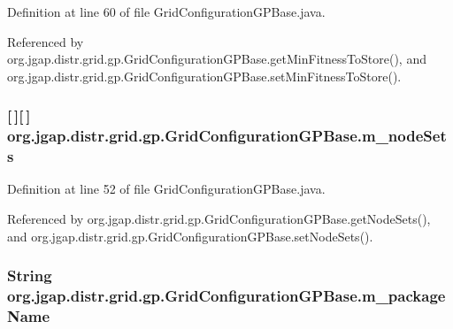 Definition at line 60 of file Grid\-Configuration\-G\-P\-Base.\-java.



Referenced by org.\-jgap.\-distr.\-grid.\-gp.\-Grid\-Configuration\-G\-P\-Base.\-get\-Min\-Fitness\-To\-Store(), and org.\-jgap.\-distr.\-grid.\-gp.\-Grid\-Configuration\-G\-P\-Base.\-set\-Min\-Fitness\-To\-Store().

\hypertarget{classorg_1_1jgap_1_1distr_1_1grid_1_1gp_1_1_grid_configuration_g_p_base_a838942c287a96ee78bdb39aa2fd7966a}{
\subsubsection[{m\-\_\-node\-Sets}]{ \mbox{[}$\,$\mbox{]}\mbox{[}$\,$\mbox{]} org.\-jgap.\-distr.\-grid.\-gp.\-Grid\-Configuration\-G\-P\-Base.\-m\-\_\-node\-Sets\hspace{0.3cm}{\ttfamily [private]}}}\label{classorg_1_1jgap_1_1distr_1_1grid_1_1gp_1_1_grid_configuration_g_p_base_a838942c287a96ee78bdb39aa2fd7966a}


Definition at line 52 of file Grid\-Configuration\-G\-P\-Base.\-java.



Referenced by org.\-jgap.\-distr.\-grid.\-gp.\-Grid\-Configuration\-G\-P\-Base.\-get\-Node\-Sets(), and org.\-jgap.\-distr.\-grid.\-gp.\-Grid\-Configuration\-G\-P\-Base.\-set\-Node\-Sets().

\hypertarget{classorg_1_1jgap_1_1distr_1_1grid_1_1gp_1_1_grid_configuration_g_p_base_ae66c37906c01e4c5d2a60d3d62a0574e}{
\subsubsection[{m\-\_\-package\-Name}]{\setlength{\rightskip}{0pt plus 5cm}String org.\-jgap.\-distr.\-grid.\-gp.\-Grid\-Configuration\-G\-P\-Base.\-m\-\_\-package\-Name\hspace{0.3cm}{\ttfamily [private]}}}\label{classorg_1_1jgap_1_1distr_1_1grid_1_1gp_1_1_grid_configuration_g_p_base_ae66c37906c01e4c5d2a60d3d62a0574e}


